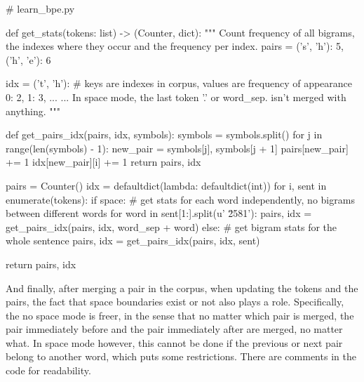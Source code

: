 \begin{python}
# learn_bpe.py

def get_stats(tokens: list) -> (Counter, dict):
  """
  Count frequency of all bigrams, the indexes where they occur and the frequency per index.
  pairs = {
    ('s', 'h'): 5,
    ('h', 'e'): 6
  }

  idx = {
    ('t', 'h'): {
        # keys are indexes in corpus, values are frequency of appearance
        0: 2,
        1: 3,
        ...
    }
    ...
  }
  In space mode, the last token '.' or word_sep. isn't merged with anything.
  """

  def get_pairs_idx(pairs, idx, symbols):
    symbols = symbols.split()
    for j in range(len(symbols) - 1):
      new_pair = symbols[j], symbols[j + 1]
      pairs[new_pair] += 1
      idx[new_pair][i] += 1
    return pairs, idx

  pairs = Counter()
  idx = defaultdict(lambda: defaultdict(int))
  for i, sent in enumerate(tokens):
    if space:
      # get stats for each word independently, no bigrams between different words
      for word in sent[1:].split(u' \u2581'):
      pairs, idx = get_pairs_idx(pairs, idx, word_sep + word)
    else:
      # get bigram stats for the whole sentence
      pairs, idx = get_pairs_idx(pairs, idx, sent)

  return pairs, idx
\end{python}

And finally, after merging a pair in the corpus, when updating the tokens and the pairs, the fact that space boundaries exist or not also plays a role. Specifically, the no space mode is freer, in the sense that no matter which pair is merged, the pair immediately before and the pair immediately after are merged, no matter what. In space mode however, this cannot be done if the previous or next pair belong to another word, which puts some restrictions. There are comments in the code for readability.

